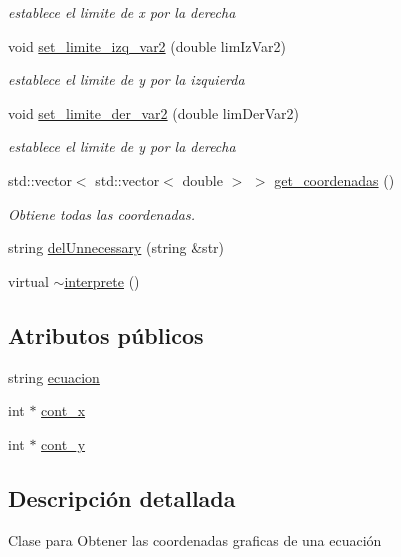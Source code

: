 \begin{DoxyCompactItemize}
\begin{DoxyCompactList}\small\item\em establece el limite de x por la derecha \end{DoxyCompactList}\item 
void \hyperlink{classinterprete_ac32fc5f28fa505c5dcd90984cbd89a9f}{set\+\_\+limite\+\_\+izq\+\_\+var2} (double lim\+Iz\+Var2)
\begin{DoxyCompactList}\small\item\em establece el limite de y por la izquierda \end{DoxyCompactList}\item 
void \hyperlink{classinterprete_a0e0a9920dd96b8fdab67bf373978bec8}{set\+\_\+limite\+\_\+der\+\_\+var2} (double lim\+Der\+Var2)
\begin{DoxyCompactList}\small\item\em establece el limite de y por la derecha \end{DoxyCompactList}\item 
std\+::vector$<$ std\+::vector$<$ double $>$ $>$ \hyperlink{classinterprete_a7192cffb926a47a22526d0ba3a6d661c}{get\+\_\+coordenadas} ()
\begin{DoxyCompactList}\small\item\em Obtiene todas las coordenadas. \end{DoxyCompactList}\item 
string \hyperlink{classinterprete_a41c011e8adcc3f7cf0348b29f273d343}{del\+Unnecessary} (string \&str)
\item 
virtual \hyperlink{classinterprete_ad1a7e4167394a6e408742cf7336714f2}{$\sim$interprete} ()
\end{DoxyCompactItemize}
\subsection*{Atributos públicos}
\begin{DoxyCompactItemize}
\item 
string \hyperlink{classinterprete_ab268b0d71f72cd82f186376c17444543}{ecuacion}
\item 
int $\ast$ \hyperlink{classinterprete_a1a2c9c848bc7d438ada181325b9bd109}{cont\+\_\+x}
\item 
int $\ast$ \hyperlink{classinterprete_a034d92459f0a0466cc717c08faaab481}{cont\+\_\+y}
\end{DoxyCompactItemize}


\subsection{Descripción detallada}
Clase para Obtener las coordenadas graficas de una ecuación

